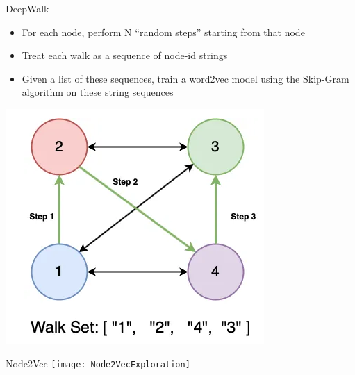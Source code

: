 \begin{frame}[t]{DeepWalk}

    \begin{itemize}
        \item For each node, perform N “random steps” starting from that node
        \item Treat each walk as a sequence of node-id strings
        \item Given a list of these sequences, train a word2vec model using the Skip-Gram algorithm on these string sequences
    \end{itemize}

    \includegraphics[scale=.33]{images/DeepWalkRandomWalk.png}
\end{frame}

\begin{frame}[t]{Node2Vec}
    \texttt{[image: Node2VecExploration]}

\end{frame}